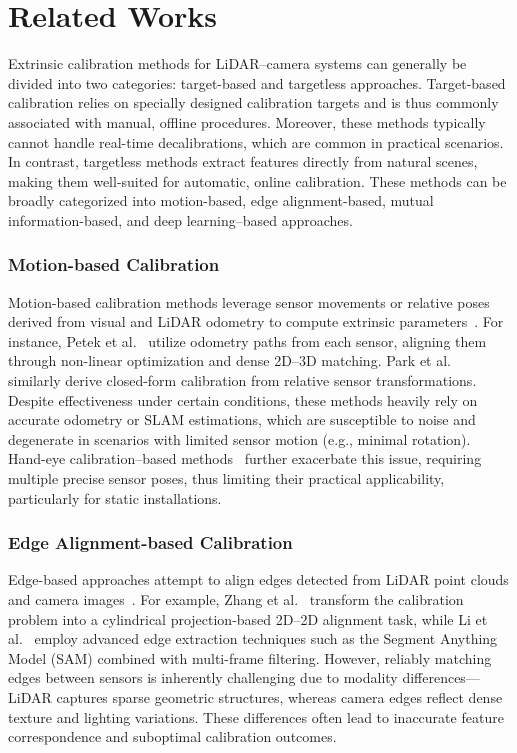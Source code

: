 \section{Related Works}
Extrinsic calibration methods for LiDAR–camera systems can generally be divided into two categories: target-based and targetless approaches. Target-based calibration relies on specially designed calibration targets and is thus commonly associated with manual, offline procedures. Moreover, these methods typically cannot handle real-time decalibrations, which are common in practical scenarios. In contrast, targetless methods extract features directly from natural scenes, making them well-suited for automatic, online calibration.
These methods can be broadly categorized into motion-based, edge alignment-based, mutual information-based, and deep learning–based approaches.

\subsubsection{Motion-based Calibration}
Motion-based calibration methods leverage sensor movements or relative poses derived from visual and LiDAR odometry to compute extrinsic parameters~\cite{petek2024automatic,park2020spatiotemporal,yoon2021targetless}. For instance, Petek et al.~\cite{petek2024automatic} utilize odometry paths from each sensor, aligning them through non-linear optimization and dense 2D–3D matching. Park et al.~\cite{park2020spatiotemporal} similarly derive closed-form calibration from relative sensor transformations. Despite effectiveness under certain conditions, these methods heavily rely on accurate odometry or SLAM estimations, which are susceptible to noise and degenerate in scenarios with limited sensor motion (e.g., minimal rotation). Hand-eye calibration–based methods~\cite{ou2023targetless} further exacerbate this issue, requiring multiple precise sensor poses, thus limiting their practical applicability, particularly for static installations.

\subsubsection{Edge Alignment-based Calibration}
Edge-based approaches attempt to align edges detected from LiDAR point clouds and camera images~\cite{zhang2022multi,li2024edgecalib,yuan2021pixel}. For example, Zhang et al.~\cite{zhang2022multi} transform the calibration problem into a cylindrical projection-based 2D–2D alignment task, while Li et al.~\cite{li2024edgecalib} employ advanced edge extraction techniques such as the Segment Anything Model (SAM) combined with multi-frame filtering. However, reliably matching edges between sensors is inherently challenging due to modality differences—LiDAR captures sparse geometric structures, whereas camera edges reflect dense texture and lighting variations. These differences often lead to inaccurate feature correspondence and suboptimal calibration outcomes.

